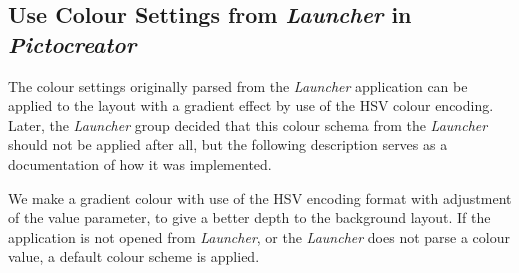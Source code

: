 \subsection{Use Colour Settings from \textit{Launcher} in \textit{Pictocreator}}
The colour settings originally parsed from the \textit{Launcher} application can be applied to the layout with a gradient effect by use of the HSV colour encoding.
Later, the \textit{Launcher} group decided that this colour schema from the \textit{Launcher} should not be applied after all, but the following description serves as a documentation of how it was implemented.

We make a gradient colour with use of the HSV encoding format with adjustment of the value parameter, to give a better depth to the background layout.
If the application is not opened from \textit{Launcher}, or the \textit{Launcher} does not parse a colour value, a default colour scheme is applied.
